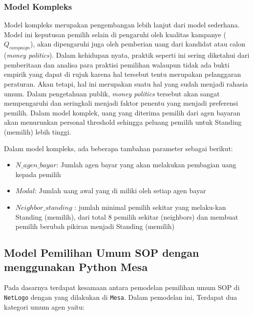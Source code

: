 \subsubsection{Model Kompleks}

Model kompleks merupakan pengembangan lebih lanjut dari model sederhana. Model ini keputusan pemilih selain di pengaruhi oleh kualitas kampanye ($Q_{campaign}$), akan dipengaruhi juga oleh pemberian uang dari kandidat atau calon (\textit{money politics}). Dalam kehidupan nyata, praktik seperti ini sering diketahui dari pemberitaan dan analisa para praktisi pemilihan walaupun tidak ada bukti empirik yang dapat di rujuk karena hal tersebut tentu merupakan pelanggaran peraturan. Akan tetapi, hal ini merupakan suatu hal yang sudah menjadi rahasia umum. Dalam pengetahuan publik, \textit{money politics} tersebut akan sangat mempengaruhi dan seringkali menjadi faktor penentu yang menjadi preferensi pemilih. Dalam model komplek, uang yang diterima pemilih dari agen bayaran akan menurunkan personal threshold sehingga peluang pemilih untuk Standing (memilih) lebih tinggi.

Dalam model kompleks, ada beberapa tambahan parameter sebagai berikut:

\begin{itemize}
\item $N\_agen\_bayar$: Jumlah agen bayar yang akan melakukan pembagian uang kepada pemilih

\item $Modal$: Jumlah uang awal yang di miliki oleh setiap agen bayar

\item $Neighbor\_standing$ : jumlah minimal pemilih sekitar yang melaku-kan Standing (memilih), dari total 8 pemilih sekitar (neighbors) dan membuat pemilih berubah pikiran menjadi Standing (memilih)
\end{itemize}

\subsection{Model Pemilihan Umum SOP dengan menggunakan Python Mesa}

Pada dasarnya terdapat kesamaan antara pemodelan pemilihan umum SOP di \texttt{NetLogo} dengan yang dilakukan di \texttt{Mesa}. Dalam pemodelan ini, Terdapat dua kategori umum agen yaitu:

